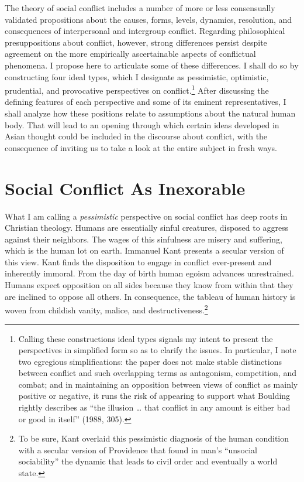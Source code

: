 The theory of social conflict includes a number of more or less consensually validated propositions about the causes, forms, levels, dynamics, resolution, and consequences of interpersonal and intergroup conflict. Regarding philosophical presuppositions about conflict, however, strong differences persist despite agreement on the more empirically ascertainable aspects of conflictual phenomena. I propose here to articulate some of these differences. I shall do so by constructing four ideal types, which I designate as pessimistic, optimistic, prudential, and provocative perspectives on conflict.\footnote{Calling these constructions ideal types signals my intent to present the perspectives in simplified form so as to clarify the issues. In particular, I note two egregious simplifications: the paper does not make stable distinctions between conflict and such overlapping terms as antagonism, competition, and combat; and in maintaining an opposition between views of conflict as mainly positive or negative, it runs the risk of appearing to support what Boulding rightly describes as ``the illusion \ldots{} that conflict in any amount is either bad or good in itself'' (1988, 305).} After discussing the defining features of each perspective and some of its eminent representatives, I shall analyze how these positions relate to assumptions about the natural human body. That will lead to an opening through which certain ideas developed in Asian thought could be included in the discourse about conflict, with the consequence of inviting us to take a look at the entire subject in fresh ways. 

\section*{Social Conflict As Inexorable}

What I am calling a \emph{pessimistic} perspective on social conflict has deep roots in Christian theology. Humans are essentially sinful creatures, disposed to aggress against their neighbors. The wages of this sinfulness are misery and suffering, which is the human lot on earth. Immanuel Kant presents a secular version of this view. Kant finds the disposition to engage in conflict ever-present and inherently immoral. From the day of birth human egoism advances unrestrained. Humans expect opposition on all sides because they know from within that they are inclined to oppose all others. In consequence, the tableau of human history is woven from childish vanity, malice, and destructiveness.\footnote{To be sure, Kant overlaid this pessimistic diagnosis of the human condition with a secular version of Providence that found in man's ``unsocial sociability'' the dynamic that leads to civil order and eventually a world state.}

